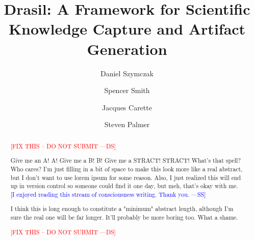 \documentclass[sigconf]{acmart}
\newcommand{\authornt}[3]{\textcolor{#1}{[#3 ---#2]}}
\newcommand{\authornt}[3]{}
\newcommand{\ds}[1]{\authornt{red}{DS}{#1}} %
\newcommand{\wss}[1]{\authornt{blue}{SS}{#1}} %
\begin{document}
\title[Drasil Framework]{Drasil: A Framework for Scientific Knowledge Capture and Artifact Generation}

\author{Daniel Szymczak}

\author{Spencer Smith}

\author{Jacques Carette}

\author{Steven Palmer}


\begin{abstract}

\ds{FIX THIS -- DO NOT SUBMIT}

Give me an A! A! Give me a B! B! Give me a STRACT! STRACT! What's that spell? 
Who cares? I'm just filling in a bit of space to make this look more like a 
real abstract, but I don't want to use lorem ipsum for some reason. Also, I 
just realized this will end up in version control so someone could find it one 
day, but meh, that's okay with me.  \wss{I enjoyed reading this stream of
  consciousness writing.  Thank you.}

I think this is long enough to constitute a "minimum" abstract length, although 
I'm sure the real one will be far longer. It'll probably be more boring too. What a shame.

\ds{FIX THIS -- DO NOT SUBMIT}

\end{abstract}
\end{document}
